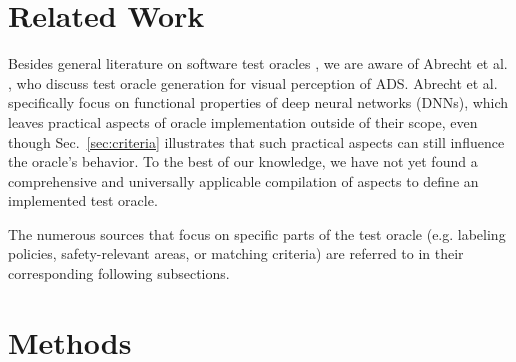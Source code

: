 \documentclass[conference]{IEEEtran}
\begin{document}

\section{Related Work}
\label{sec:related_work}

Besides general literature on software test oracles \cite{Barr2015oracle}, we are aware of Abrecht et al. \cite{Abrecht2021testing}, who discuss test oracle generation for visual perception of ADS.
Abrecht et al. specifically focus on functional properties of deep neural networks (DNNs), which leaves practical aspects of oracle implementation outside of their scope, even though Sec.~\ref{sec:criteria} illustrates that such practical aspects can still influence the oracle's behavior.
To the best of our knowledge, we have not yet found a comprehensive and universally applicable compilation of aspects to define an implemented test oracle.

The numerous sources that focus on specific parts of the test oracle (e.g. labeling policies, safety-relevant areas, or matching criteria) are referred to in their corresponding following subsections. %




\section{Methods} %
\label{sec:method}
\end{document}
